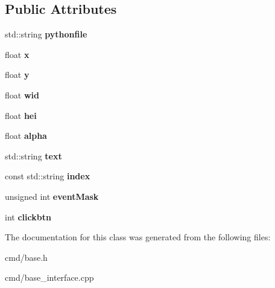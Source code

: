 \subsection*{Public Attributes}
\begin{DoxyCompactItemize}
\item 
std\+::string {\bfseries pythonfile}\hypertarget{classBaseInterface_1_1Room_1_1Link_a502a66474f2abd729bc536926d9c684a}{}\label{classBaseInterface_1_1Room_1_1Link_a502a66474f2abd729bc536926d9c684a}

\item 
float {\bfseries x}\hypertarget{classBaseInterface_1_1Room_1_1Link_a1cdc2edd6b2cfb7568a05741eabbbb8a}{}\label{classBaseInterface_1_1Room_1_1Link_a1cdc2edd6b2cfb7568a05741eabbbb8a}

\item 
float {\bfseries y}\hypertarget{classBaseInterface_1_1Room_1_1Link_a91aa1d740a75ff7284de9dff568ed2f3}{}\label{classBaseInterface_1_1Room_1_1Link_a91aa1d740a75ff7284de9dff568ed2f3}

\item 
float {\bfseries wid}\hypertarget{classBaseInterface_1_1Room_1_1Link_a972b5f8d35f5d093d4924d6e8ed914f0}{}\label{classBaseInterface_1_1Room_1_1Link_a972b5f8d35f5d093d4924d6e8ed914f0}

\item 
float {\bfseries hei}\hypertarget{classBaseInterface_1_1Room_1_1Link_a07a6d0c943cb624832fb2505a98836f1}{}\label{classBaseInterface_1_1Room_1_1Link_a07a6d0c943cb624832fb2505a98836f1}

\item 
float {\bfseries alpha}\hypertarget{classBaseInterface_1_1Room_1_1Link_aeb7ad74ccd6e3ca0dfd561e550940138}{}\label{classBaseInterface_1_1Room_1_1Link_aeb7ad74ccd6e3ca0dfd561e550940138}

\item 
std\+::string {\bfseries text}\hypertarget{classBaseInterface_1_1Room_1_1Link_a3a5110d6aa520b5e87168be5f57c96f4}{}\label{classBaseInterface_1_1Room_1_1Link_a3a5110d6aa520b5e87168be5f57c96f4}

\item 
const std\+::string {\bfseries index}\hypertarget{classBaseInterface_1_1Room_1_1Link_a3f437252c333c9e84442720b973fd5a7}{}\label{classBaseInterface_1_1Room_1_1Link_a3f437252c333c9e84442720b973fd5a7}

\item 
unsigned int {\bfseries event\+Mask}\hypertarget{classBaseInterface_1_1Room_1_1Link_a3b1662e9444d4624ef9996c75a82235e}{}\label{classBaseInterface_1_1Room_1_1Link_a3b1662e9444d4624ef9996c75a82235e}

\item 
int {\bfseries clickbtn}\hypertarget{classBaseInterface_1_1Room_1_1Link_aae63914dedcc12cc88053ff642237ca1}{}\label{classBaseInterface_1_1Room_1_1Link_aae63914dedcc12cc88053ff642237ca1}

\end{DoxyCompactItemize}


The documentation for this class was generated from the following files\+:\begin{DoxyCompactItemize}
\item 
cmd/base.\+h\item 
cmd/base\+\_\+interface.\+cpp\end{DoxyCompactItemize}
